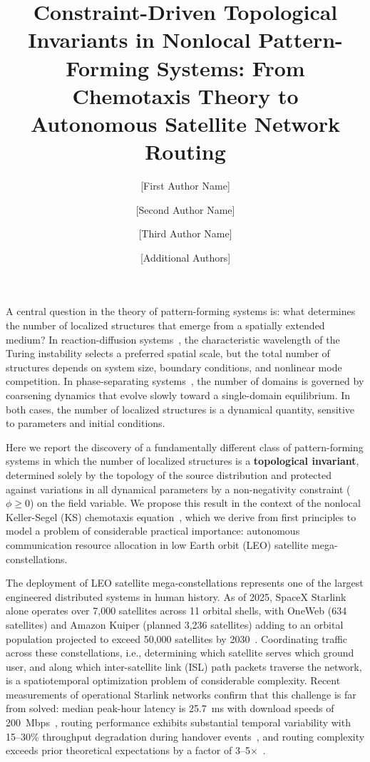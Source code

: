 \documentclass[sn-nature,pdflatex]{sn-jnl}
\title{Constraint-Driven Topological Invariants in Nonlocal Pattern-Forming Systems: From Chemotaxis Theory to Autonomous Satellite Network Routing}
\author[1,*]{[First Author Name]}
\author[2]{[Second Author Name]}
\author[1,3]{[Third Author Name]}
\author[1]{[Additional Authors]}
\affil[1]{[Department], [Institution], [City], [Country]}
\affil[2]{[Department], [Institution], [City], [Country]}
\affil[3]{[Department], [Institution], [City], [Country]}
\affil[*]{Corresponding author: [email]@[institution].edu}
\begin{document}
\maketitle


A central question in the theory of pattern-forming systems is: what determines the number of localized structures that emerge from a spatially extended medium?
In reaction-diffusion systems~\cite{turing_1952,gierer_meinhardt_1972,cross_hohenberg_1993}, the characteristic wavelength of the Turing instability selects a preferred spatial scale, but the total number of structures depends on system size, boundary conditions, and nonlinear mode competition.
In phase-separating systems~\cite{chaikin_lubensky_1995}, the number of domains is governed by coarsening dynamics that evolve slowly toward a single-domain equilibrium.
In both cases, the number of localized structures is a dynamical quantity, sensitive to parameters and initial conditions.

Here we report the discovery of a fundamentally different class of pattern-forming systems in which the number of localized structures is a \textbf{topological invariant}, determined solely by the topology of the source distribution and protected against variations in all dynamical parameters by a non-negativity constraint ($\phi \ge 0$) on the field variable.
We propose this result in the context of the nonlocal Keller-Segel (KS) chemotaxis equation~\cite{keller_segel_1970,keller_segel_1971,patlak_1953}, which we derive from first principles to model a problem of considerable practical importance: autonomous communication resource allocation in low Earth orbit (LEO) satellite mega-constellations.

The deployment of LEO satellite mega-constellations represents one of the largest engineered distributed systems in human history.
As of 2025, SpaceX Starlink alone operates over 7,000 satellites across 11 orbital shells, with OneWeb (634 satellites) and Amazon Kuiper (planned 3,236 satellites) adding to an orbital population projected to exceed 50,000 satellites by 2030~\cite{handley_2018,del_portillo_2019}.
Coordinating traffic across these constellations, i.e., determining which satellite serves which ground user, and along which inter-satellite link (ISL) path packets traverse the network, is a spatiotemporal optimization problem of considerable complexity.
Recent measurements of operational Starlink networks confirm that this challenge is far from solved: median peak-hour latency is 25.7~ms with download speeds of 200~Mbps~\cite{starlink_2025_update}, routing performance exhibits substantial temporal variability with 15--30\% throughput degradation during handover events~\cite{ma_2023_infocom,mohan_2024_www}, and routing complexity exceeds prior theoretical expectations by a factor of 3--5$\times$~\cite{izhikevich_2024_sigmetrics}.
\end{document}
